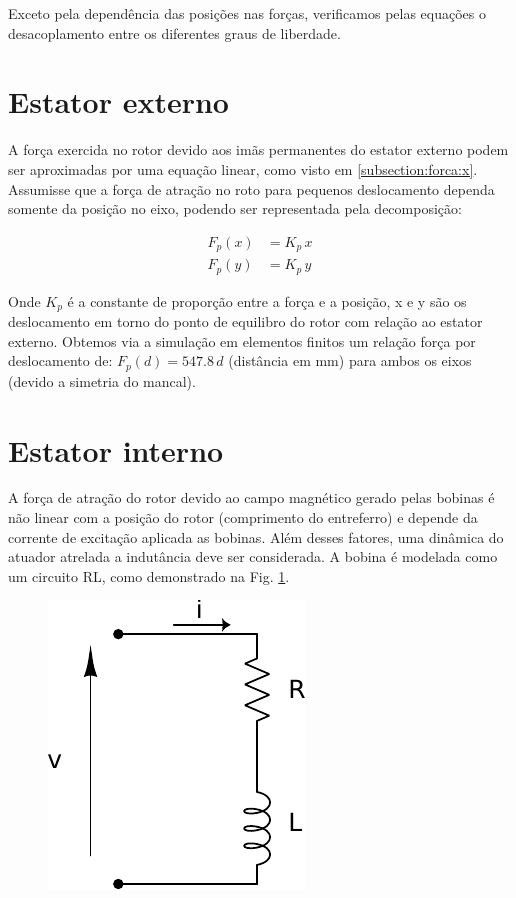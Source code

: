  Exceto pela dependência das posições nas forças, verificamos pelas equações o desacoplamento entre os diferentes graus de liberdade. 
 
 
%


\section{Estator externo}

A força exercida no rotor devido aos imãs permanentes do estator externo podem ser aproximadas por uma equação linear, como visto em \ref{subsection:forca:x}. Assumisse que a força de atração no roto para pequenos deslocamento dependa somente da posição no eixo, podendo ser representada pela decomposição:

\begin{align}
	F_p(x) &= K_p \, x \\
	F_p(y) &= K_p \, y 
\end{align}

Onde $K_p$ é a constante de proporção entre a força e a posição, x e y são os deslocamento em torno do ponto de equilibro do rotor com relação ao estator externo. Obtemos via a simulação em elementos finitos um relação força por deslocamento de: $ F_p(d) = 547.8 \,d $ (distância em mm) para ambos os eixos (devido a simetria do mancal).

\section{Estator interno}

A força de atração do rotor devido ao campo magnético gerado pelas bobinas é não linear com a posição do rotor (comprimento do entreferro) e depende da corrente de excitação aplicada as bobinas. Além desses fatores, uma dinâmica do atuador atrelada a indutância deve ser considerada. A bobina é modelada como um circuito RL, como demonstrado na Fig. \ref{fig:dinamico:EI:Bobina}.

\begin{figure}[th!]
\centering
\includegraphics[width=0.2\linewidth]{Figs/Modelagem/EI_Bobina}
\caption{}
\label{fig:dinamico:EI:Bobina}
\end{figure}

